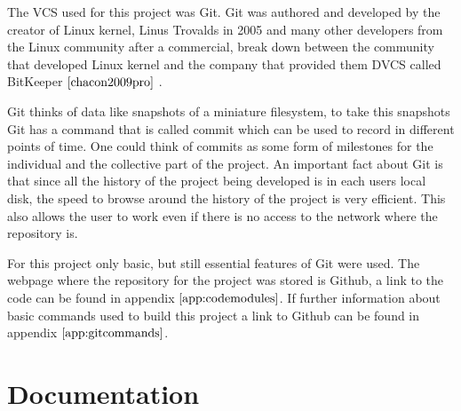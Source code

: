 The VCS used for this project was Git. Git was authored and developed by the creator of Linux kernel, Linus Trovalds in 2005 and many other developers from the Linux community after a commercial, break down between the community that developed Linux kernel and the company that provided them DVCS called BitKeeper $\cite{chacon2009pro}$ . 

Git thinks of data like snapshots of a miniature filesystem, to take this snapshots Git has a command that is called commit which can be used to record in different points of time. One could think of commits as some form of milestones for the individual and the collective part of the project. An important fact about Git is that since all the history of the project being developed is in each users local disk, the speed to browse around the history of the project is very efficient. This also allows the user to work even if there is no access to the network where the repository is. 

For this project only basic, but still essential features of Git were used. The webpage where the repository for the project was stored is Github, a link to the code can be found in appendix $\ref{app:codemodules}$.  If further information about basic commands used to build this project a link to Github can be found in appendix $\ref{app:gitcommands}$.

\section{Documentation}


